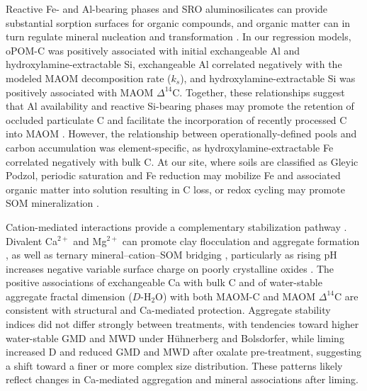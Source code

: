 \documentclass[preprint,12pt]{elsarticle}
\begin{document}
Reactive Fe- and Al-bearing phases and SRO aluminosilicates can provide substantial sorption surfaces for organic compounds, and organic matter can in turn regulate mineral nucleation and transformation \citep{kleber2021dynamic,maier2025parent,matsuoka2025formation,steinwidder2025beyond}. In our regression models, oPOM-C was positively associated with initial exchangeable Al and hydroxylamine-extractable Si, exchangeable Al correlated negatively with the modeled MAOM decomposition rate ($k_s$), and hydroxylamine-extractable Si was positively associated with MAOM $\Delta^{14}$C. Together, these relationships suggest that Al availability and reactive Si-bearing phases may promote the retention of occluded particulate C and facilitate the incorporation of recently processed C into MAOM \citep{Keiluweit2015,khomo2017timescales,stewart2008saturation}. However, the relationship between operationally-defined pools and carbon accumulation was element-specific, as hydroxylamine-extractable Fe correlated negatively with bulk C. At our site, where soils are classified as Gleyic Podzol, periodic saturation and Fe reduction may mobilize Fe and associated organic matter into solution resulting in C loss, or redox cycling may promote SOM mineralization \citep{Xu2024, Emsens2016}.

Cation-mediated interactions provide a complementary stabilization pathway \citep{Rowley2018,Buss2024,sokol2024reduced}. Divalent Ca$^{2+}$ and Mg$^{2+}$ can promote clay flocculation and aggregate formation \citep{TisdallOades1982,muneer1989calcium}, as well as ternary mineral--cation--SOM bridging \citep{rowley2021calcium}, particularly as rising pH increases negative variable surface charge on poorly crystalline oxides \citep{jiang2026molecular}. The positive associations of exchangeable Ca with bulk C and of water-stable aggregate fractal dimension ($D$-H$_2$O) with both MAOM-C and MAOM $\Delta^{14}$C are consistent with structural and Ca-mediated protection. Aggregate stability indices did not differ strongly between treatments, with tendencies toward higher water-stable GMD and MWD under H\"uhnerberg and Bolsdorfer, while liming increased D and reduced GMD and MWD after oxalate pre-treatment, suggesting a shift toward a finer or more complex size distribution. These patterns likely reflect changes in Ca-mediated aggregation and mineral associations after liming.
\end{document}
